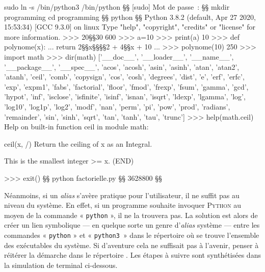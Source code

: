 \begin{fullwidth}
\begin{ubuntu}
sudo ln -s /bin/python3 /bin/python §\startconsole§
[sudo] Mot de passe :
§§
mkdir programming
cd programming §§
python §\startconsole§
Python 3.8.2 (default, Apr 27 2020, 15:53:34) 
[GCC 9.3.0] on linux
Type "help", "copyright", "credits" or "license" for more information.
>>> 20§\shmult§30
600
>>> a=10
>>> print(a)
10
>>> def polynome(x):
...     return 2§\shmult§x§\shmult§§\shmult§2 + 4§\shmult§x + 10
... 
>>> polynome(10)
250
>>> import math
>>> dir(math)
['__doc__', '__loader__', '__name__', '__package__', '__spec__', 'acos', 'acosh', 'asin', 'asinh', 'atan', 'atan2', 'atanh', 'ceil', 'comb', 'copysign', 'cos', 'cosh', 'degrees', 'dist', 'e', 'erf', 'erfc', 'exp', 'expm1', 'fabs', 'factorial', 'floor', 'fmod', 'frexp', 'fsum', 'gamma', 'gcd', 'hypot', 'inf', 'isclose', 'isfinite', 'isinf', 'isnan', 'isqrt', 'ldexp', 'lgamma', 'log', 'log10', 'log1p', 'log2', 'modf', 'nan', 'perm', 'pi', 'pow', 'prod', 'radians', 'remainder', 'sin', 'sinh', 'sqrt', 'tan', 'tanh', 'tau', 'trunc']
>>> help(math.ceil)
Help on built-in function ceil in module math:

ceil(x, /)
    Return the ceiling of x as an Integral.
    
    This is the smallest integer >= x.
(END)

>>> exit() §§
python factorielle.py §\startconsole§
3628800 §§
\end{ubuntu}
\end{fullwidth}

Néanmoins, si un \textit{alias} s'avère pratique pour l'utilisateur, il ne suffit pas au niveau du système. En effet, si un programme souhaite invoquer \textsc{Python} au moyen de la commande « \texttt{python} », il ne la trouvera pas. La solution est alors de créer un lien symbolique --- en quelque sorte un genre d'\textit{alias} système --- entre les commandes « \texttt{python} » et « \texttt{python3}~» dans le répertoire  où se trouve l'ensemble des exécutables du système. Si d'aventure cela ne suffisait pas à l'avenir, penser à réitérer la démarche dans le répertoire . Les étapes à suivre sont synthétisées dans la simulation de terminal ci-dessous.

